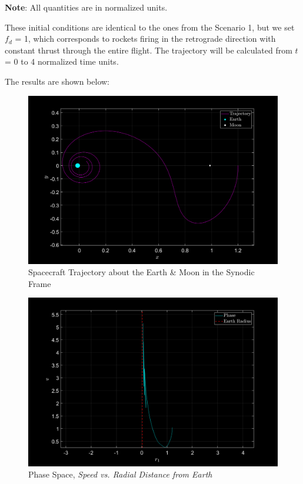 \documentclass{article}
\begin{document}
\textbf{Note}: All quantities are in normalized units.

\vspace{\baselineskip}

These initial conditions are identical to the ones from the Scenario 1, but we set $f_d$ = 1, which corresponds to rockets firing in the retrograde direction with constant thrust through the entire flight. The trajectory will be calculated from $t$ = 0 to 4 normalized time units.

\vspace{\baselineskip}

The results are shown below:

\begin{figure}[h]
  \centering
  \includegraphics[width=\textwidth]{fig/trajectory2.png}
  \caption{Spacecraft Trajectory about the Earth \& Moon in the Synodic Frame}
  \label{fig3}
\end{figure}

\pagebreak

\begin{figure}[!h]
  \centering
  \includegraphics[width=\textwidth]{fig/phase2.png}
  \caption{Phase Space, \textit{Speed vs. Radial Distance from Earth}}
  \label{fig4}
\end{figure}
\end{document}
